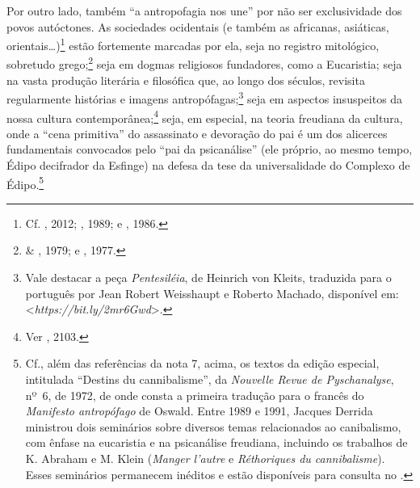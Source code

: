 Por outro lado, também ``a antropofagia nos une'' por não ser
exclusividade dos povos autóctones. As sociedades ocidentais (e também
as africanas, asiáticas, orientais\ldots{})\footnote{Cf. ,
  2012; , 1989; e , 1986.} estão fortemente marcadas por
ela, seja no registro mitológico, sobretudo grego;\footnote{ \&
  , 1979; e , 1977.} seja em dogmas religiosos
fundadores, como a Eucaristia; seja na vasta produção literária e
filosófica que, ao longo dos séculos, revisita regularmente histórias e
imagens antropófagas;\footnote{Vale destacar a peça \emph{Pentesiléia},
  de Heinrich von Kleits, traduzida para o português por Jean Robert
  Weisshaupt e Roberto Machado, disponível em:
  \textless{}\emph{https://bit.ly/2mr6Gwd}\textgreater{}.}
seja em aspectos insuspeitos da nossa cultura contemporânea;\footnote{Ver
  , 2103.} seja, em especial, na teoria freudiana da
cultura, onde a ``cena primitiva'' do assassinato e devoração do pai é
um dos alicerces fundamentais convocados pelo ``pai da psicanálise''
(ele próprio, ao mesmo tempo, Édipo decifrador da Esfinge) na defesa da
tese da universalidade do Complexo de Édipo.\footnote{Cf., além das
  referências da nota 7, acima, os textos da edição especial, intitulada
  ``Destins du cannibalisme'', da \emph{Nouvelle Revue de Pyschanalyse},
  nº~6, de 1972, de onde consta a primeira tradução para o francês do
  \emph{Manifesto antropófago} de Oswald. Entre 1989 e 1991, Jacques
  Derrida ministrou dois seminários sobre diversos temas relacionados ao
  canibalismo, com ênfase na eucaristia e na psicanálise freudiana,
  incluindo os trabalhos de K. Abraham e M. Klein (\emph{Manger l'autre}
  e \emph{Réthoriques du cannibalisme}). Esses seminários permanecem
  inéditos e estão disponíveis para consulta no .}

